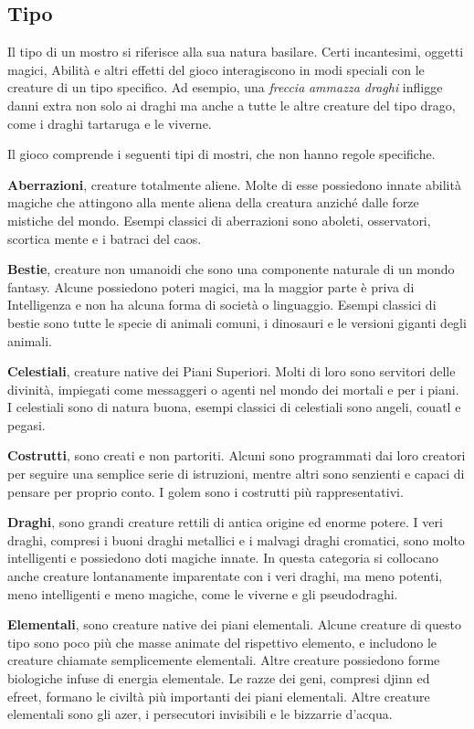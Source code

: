 \begin{multicols}{2}
\subsection{Tipo}

Il tipo di un mostro si riferisce alla sua natura basilare. Certi incantesimi, oggetti magici, Abilità e altri effetti del gioco interagiscono in modi speciali con le creature di un tipo specifico. Ad esempio, una \emph{freccia} \emph{ammazza draghi} infligge danni extra non solo ai draghi ma anche a tutte le altre creature del tipo drago, come i draghi tartaruga e le viverne.

Il gioco comprende i seguenti tipi di mostri, che non hanno regole specifiche.

\medskip\textbf{Aberrazioni}, creature totalmente aliene. Molte di esse possiedono innate abilità magiche che attingono alla mente aliena della creatura anziché dalle forze mistiche del mondo. Esempi classici di aberrazioni sono aboleti, osservatori, scortica mente e i batraci del caos.

\medskip\textbf{Bestie}, creature non umanoidi che sono una componente naturale di un mondo fantasy. Alcune possiedono poteri magici, ma la maggior parte è priva di Intelligenza e non ha alcuna forma di società o linguaggio. Esempi classici di bestie sono tutte le specie di animali comuni, i dinosauri e le versioni giganti degli animali. 

\medskip\textbf{Celestiali}, creature native dei Piani Superiori. Molti di loro sono servitori delle divinità, impiegati come messaggeri o agenti nel mondo dei mortali e per i piani.\\
I celestiali sono di natura buona, esempi classici di celestiali sono angeli, couatl e pegasi.

\medskip\textbf{Costrutti}, sono creati e non partoriti. Alcuni sono programmati dai loro creatori per seguire una semplice serie di istruzioni, mentre altri sono senzienti e capaci di pensare per proprio conto. I golem sono i costrutti più rappresentativi.

\medskip\textbf{Draghi}, sono grandi creature rettili di antica origine ed enorme potere. I veri draghi, compresi i buoni draghi metallici e i malvagi draghi cromatici, sono molto intelligenti e possiedono doti magiche innate. In questa categoria si collocano anche creature lontanamente imparentate con i veri draghi, ma meno potenti, meno intelligenti e meno magiche, come le viverne e gli pseudodraghi.

\medskip\textbf{Elementali}, sono creature native dei piani elementali. Alcune creature di questo tipo sono poco più che masse animate del rispettivo elemento, e includono le creature chiamate semplicemente elementali. Altre creature possiedono forme biologiche infuse di energia elementale. Le razze dei geni, compresi djinn ed efreet, formano le civiltà più importanti dei piani elementali. Altre creature elementali sono gli azer, i persecutori  invisibili e le bizzarrie d'acqua. 


\end{multicols}
